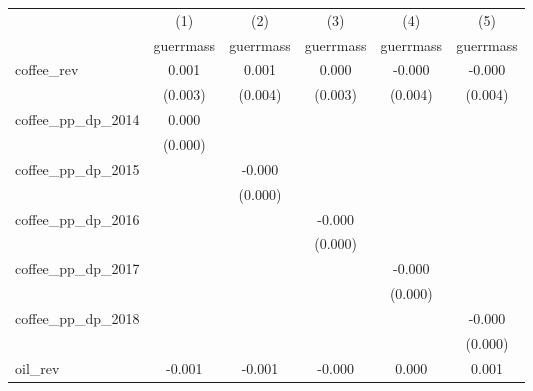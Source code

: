 {
\def\sym#1{\ifmmode^{#1}\else\(^{#1}\)\fi}
\begin{tabular}{l*{5}{c}}
\hline\hline
            &\multicolumn{1}{c}{(1)}&\multicolumn{1}{c}{(2)}&\multicolumn{1}{c}{(3)}&\multicolumn{1}{c}{(4)}&\multicolumn{1}{c}{(5)}\\
            &\multicolumn{1}{c}{guerrmass}&\multicolumn{1}{c}{guerrmass}&\multicolumn{1}{c}{guerrmass}&\multicolumn{1}{c}{guerrmass}&\multicolumn{1}{c}{guerrmass}\\
\hline
coffee\_rev  &       0.001         &       0.001         &       0.000         &      -0.000         &      -0.000         \\
            &     (0.003)         &     (0.004)         &     (0.003)         &     (0.004)         &     (0.004)         \\
[1em]
coffee\_pp\_dp\_2014&       0.000         &                     &                     &                     &                     \\
            &     (0.000)         &                     &                     &                     &                     \\
[1em]
coffee\_pp\_dp\_2015&                     &      -0.000         &                     &                     &                     \\
            &                     &     (0.000)         &                     &                     &                     \\
[1em]
coffee\_pp\_dp\_2016&                     &                     &      -0.000         &                     &                     \\
            &                     &                     &     (0.000)         &                     &                     \\
[1em]
coffee\_pp\_dp\_2017&                     &                     &                     &      -0.000         &                     \\
            &                     &                     &                     &     (0.000)         &                     \\
[1em]
coffee\_pp\_dp\_2018&                     &                     &                     &                     &      -0.000         \\
            &                     &                     &                     &                     &     (0.000)         \\
[1em]
oil\_rev     &      -0.001         &      -0.001         &      -0.000         &       0.000         &       0.001         \\

\end{tabular}}
